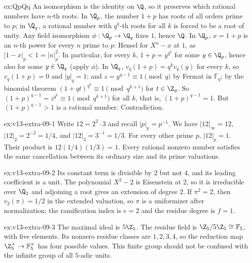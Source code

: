 \begin{solution}{ex:QpQq}
\idea An isomorphism is the identity on $\Q$, so it preserves which rational numbers have $n$-th roots. In $\Q_p$, the number
$1+p$ has roots of all orders prime to $p$; in $\Q_q$, a rational number with $q^k$-th roots for all $k$ is forced to be a root
of unity.
\writeup Any field isomorphism $\phi:\Q_p\to\Q_q$ fixes $1$, hence $\Q$. In $\Q_p$,
$x=1+p$ is an $n$-th power for every $n$ prime to $p$: Hensel for $X^n-x$ at $1$, as $|1-x|_p<1=|n|_p^2$. In particular, for every
$k$, $1+p=y^{q^k}$ for some $y\in\Q_p$, hence also for some $y\in\Q_q$ (apply $\phi$). In $\Q_q$, $v_q(1+p)=q^kv_q(y)$ for every $k$,
so $v_q(1+p)=0$ and $|y|_q=1$; and $z=y^{q-1}\equiv1\pmod q$ by Fermat in
$\mathbb F_q$; by the binomial theorem $(1+qt)^{q^k}\equiv1\pmod{q^{k+1}}$ for $t\in\Z_q$. So $(1+p)^{q-1}=z^{q^k}\equiv1\pmod
{q^{k+1}}$ for all $k$, that is, $(1+p)^{q-1}=1$. But $(1+p)^{q-1}>1$ is a rational number. Contradiction.
\end{solution}

\begin{solution}{ex:v13-extra-09-1}
\idea Write $12=2^2\cdot3$ and recall $|p|_p=p^{-1}$.
\writeup We have $|12|_\infty=12$, $|12|_2=2^{-2}=1/4$, and $|12|_3=3^{-1}=1/3$. For every other prime $p$, $|12|_p=1$. Their product is $12(1/4)(1/3)=1$. Every rational nonzero number satisfies the same cancellation between its ordinary size and its prime valuations.
\end{solution}

\begin{solution}{ex:v13-extra-09-2}
\idea Its constant term is divisible by $2$ but not $4$, and its leading coefficient is a unit.
\writeup The polynomial $X^2-2$ is Eisenstein at $2$, so it is irreducible over $\Q_2$ and adjoining a root gives an extension of degree $2$. If $\pi^2=2$, then $v_2(\pi)=1/2$ in the extended valuation, so $\pi$ is a uniformizer after normalization; the ramification index is $e=2$ and the residue degree is $f=1$.
\end{solution}

\begin{solution}{ex:v13-extra-09-3}
\idea The maximal ideal is $5\Z_5$.
\writeup The residue field is $\Z_5/5\Z_5\cong\mathbb F_5$, with five elements. Its nonzero residue classes are $1,2,3,4$, so the reduction map $\Z_5^\times\to\mathbb F_5^\times$ has four possible values. This finite group should not be confused with the infinite group of all $5$-adic units.
\end{solution}

